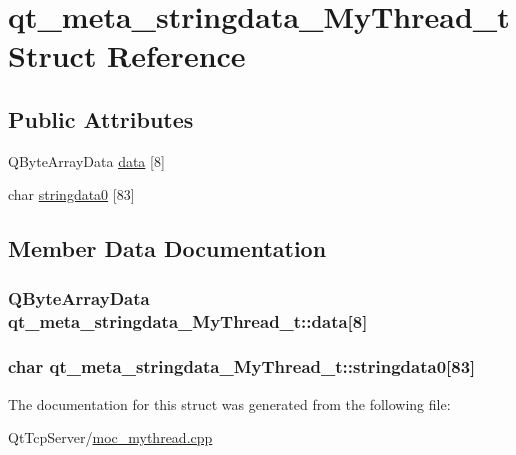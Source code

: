 \hypertarget{structqt__meta__stringdata___my_thread__t}{}\section{qt\+\_\+meta\+\_\+stringdata\+\_\+\+My\+Thread\+\_\+t Struct Reference}
\label{structqt__meta__stringdata___my_thread__t}
\subsection*{Public Attributes}
\begin{DoxyCompactItemize}
\item 
Q\+Byte\+Array\+Data \hyperlink{structqt__meta__stringdata___my_thread__t_ab5607f1078333a9d42458336e4f735dd}{data} \mbox{[}8\mbox{]}
\item 
char \hyperlink{structqt__meta__stringdata___my_thread__t_aa80f739ca8c1b5cfcf28f7f8d8666688}{stringdata0} \mbox{[}83\mbox{]}
\end{DoxyCompactItemize}


\subsection{Member Data Documentation}
\subsubsection[{\texorpdfstring{data}{data}}]{\setlength{\rightskip}{0pt plus 5cm}Q\+Byte\+Array\+Data qt\+\_\+meta\+\_\+stringdata\+\_\+\+My\+Thread\+\_\+t\+::data\mbox{[}8\mbox{]}}\hypertarget{structqt__meta__stringdata___my_thread__t_ab5607f1078333a9d42458336e4f735dd}{}\label{structqt__meta__stringdata___my_thread__t_ab5607f1078333a9d42458336e4f735dd}
\subsubsection[{\texorpdfstring{stringdata0}{stringdata0}}]{\setlength{\rightskip}{0pt plus 5cm}char qt\+\_\+meta\+\_\+stringdata\+\_\+\+My\+Thread\+\_\+t\+::stringdata0\mbox{[}83\mbox{]}}\hypertarget{structqt__meta__stringdata___my_thread__t_aa80f739ca8c1b5cfcf28f7f8d8666688}{}\label{structqt__meta__stringdata___my_thread__t_aa80f739ca8c1b5cfcf28f7f8d8666688}


The documentation for this struct was generated from the following file\+:\begin{DoxyCompactItemize}
\item 
Qt\+Tcp\+Server/\hyperlink{moc__mythread_8cpp}{moc\+\_\+mythread.\+cpp}\end{DoxyCompactItemize}
